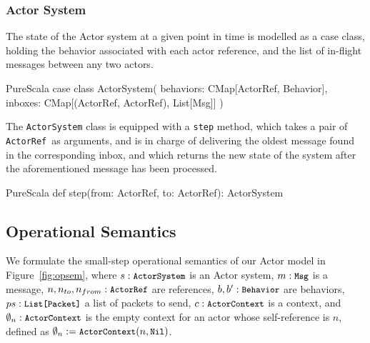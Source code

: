 \documentclass[a4paper,twoside]{article}
\newcommand{\InlineS}[1]{\lstinline[language=PureScala,basicstyle=\small\ttfamily,columns=fixed]|#1|}
\newcommand{\RefFig}[1]{Figure~\ref{#1}}
\newcommand{\ActorRef}{\InlineS{ActorRef}\ }
\newcommand{\stt}[1]{\texttt{\small{#1}}}
\begin{document}
\subsubsection*{Actor System}

The state of the Actor system at a given point in time is modelled as a case class, 
holding the behavior associated with each actor reference, and the list of in-flight messages between any two actors.


\begin{ShortCode}{PureScala}
case class ActorSystem(
  behaviors: CMap[ActorRef, Behavior],
  inboxes: CMap[(ActorRef, ActorRef), List[Msg]]
)
\end{ShortCode}

The \InlineS{ActorSystem} class is equipped with a \InlineS{step} method, which takes 
a pair of \ActorRef as arguments, and is in charge of delivering the oldest message 
found in the corresponding inbox, and which returns the new state of the system after 
the aforementioned message has been processed.

\begin{ShortCode}{PureScala}
def step(from: ActorRef, to: ActorRef): ActorSystem
\end{ShortCode}

\subsection{Operational Semantics}
\label{semantics}

We formulate the small-step operational semantics of our Actor model in 
\RefFig{fig:opsem}, where $s: \stt{ActorSystem}$ is an Actor system,
$m: \stt{Msg}$ is a message,
$n, n_{to}, n_{from}: \stt{ActorRef}$ are references,
$b, b': \stt{Behavior}$ are behaviors,
$ps: \stt{List[Packet]}$ a list of packets to send,
$c: \stt{ActorContext}$ is a context,
and $\emptyset_n: \stt{ActorContext}$ is the empty context for an actor whose
self-reference is $n$, defined as $\emptyset_n := \stt{ActorContext}(n, \stt{Nil})$.
\end{document}
